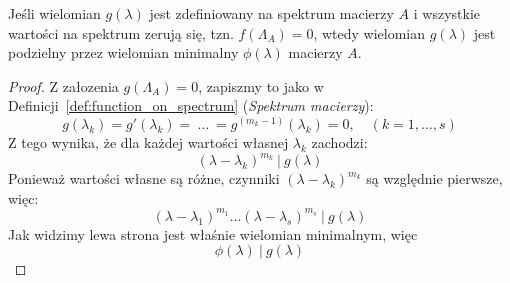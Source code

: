 \begin{lemma}\label{lemma:zero_spectrum_function}
Jeśli wielomian $g(\lambda)$ jest zdefiniowany na spektrum macierzy $A$ i wszystkie wartości na spektrum zerują się, tzn. $f(\Lambda_A) = 0$, wtedy wielomian $g(\lambda)$ jest podzielny przez wielomian minimalny $\phi(\lambda)$ macierzy $A$.
\end{lemma}
\begin{proof}
Z załozenia $g(\Lambda_A) = 0$, zapiszmy to jako w Definicji~\ref{def:function_on_spectrum} (\textit{Spektrum macierzy}):
$$ g(\lambda_k) = g'(\lambda_k) = \ \ldots \ = g^{(m_k - 1)}(\lambda_k) = 0, \quad (k = 1, \ldots, s) $$
Z tego wynika, że dla każdej wartości własnej $\lambda_k$ zachodzi:
$$ (\lambda - \lambda_k)^{m_k} \ | \ g(\lambda) $$
Ponieważ wartości własne są różne, czynniki $(\lambda - \lambda_k)^{m_k}$ są względnie pierwsze, więc:
$$ (\lambda - \lambda_1)^{m_1}\ldots(\lambda - \lambda_s)^{m_s} \ | \ g(\lambda) $$
Jak widzimy lewa strona jest właśnie wielomian minimalnym, więc
$$ \phi(\lambda) \ | \ g(\lambda) $$
\end{proof}

